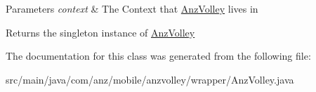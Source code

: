 \begin{DoxyParams}{Parameters}
{\em context} & The Context that \hyperlink{classcom_1_1anz_1_1mobile_1_1anzvolley_1_1wrapper_1_1_anz_volley}{Anz\+Volley} lives in \\
\hline
\end{DoxyParams}
\begin{DoxyReturn}{Returns}
the singleton instance of \hyperlink{classcom_1_1anz_1_1mobile_1_1anzvolley_1_1wrapper_1_1_anz_volley}{Anz\+Volley} 
\end{DoxyReturn}


The documentation for this class was generated from the following file\+:\begin{DoxyCompactItemize}
\item 
src/main/java/com/anz/mobile/anzvolley/wrapper/Anz\+Volley.\+java\end{DoxyCompactItemize}
